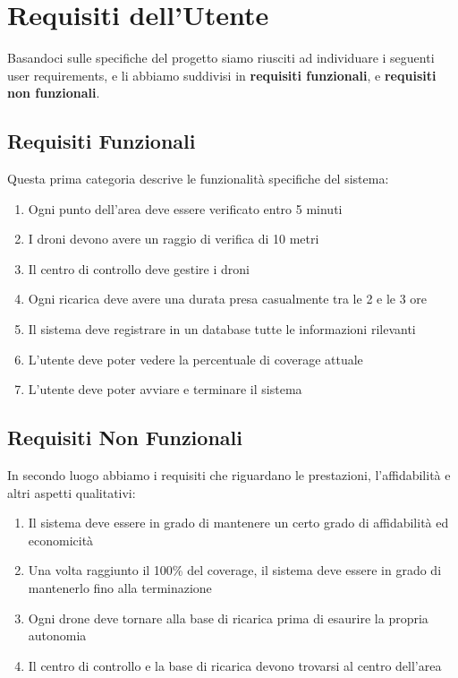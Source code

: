 \documentclass{article}
\begin{document}
\section{Requisiti dell'Utente}
\raggedright\par{\large{
		Basandoci sulle specifiche del progetto siamo riusciti ad individuare i seguenti user requirements, e li abbiamo suddivisi in \textbf{requisiti funzionali}, e \textbf{requisiti non funzionali}.
	}}  \subsection{Requisiti Funzionali}
\raggedright\par{\large{
		Questa prima categoria descrive le funzionalità specifiche del sistema:
	}}
\raggedright\par{\normalsize{
		\begin{enumerate}
			\item Ogni punto dell'area deve essere verificato entro 5 minuti
			\item I droni devono avere un raggio di verifica di 10 metri
			\item Il centro di controllo deve gestire i droni
			\item Ogni ricarica deve avere una durata presa casualmente tra le 2 e le 3 ore
			\item Il sistema deve registrare in un database tutte le informazioni rilevanti
			\item L'utente deve poter vedere la percentuale di coverage attuale
			\item L'utente deve poter avviare e terminare il sistema
		\end{enumerate}
	}}
\subsection{Requisiti Non Funzionali}
\raggedright\par{\large{
		In secondo luogo abbiamo i requisiti che riguardano le prestazioni, l'affidabilità e altri aspetti qualitativi:
	}}
\raggedright\par{\normalsize{
		\begin{enumerate}
			\item Il sistema deve essere in grado di mantenere un certo grado di affidabilità ed economicità
			\item Una volta raggiunto il 100\% del coverage, il sistema deve essere in grado di mantenerlo fino alla terminazione
			\item Ogni drone deve tornare alla base di ricarica prima di esaurire la propria autonomia
			\item Il centro di controllo e la base di ricarica devono trovarsi al centro dell'area
		\end{enumerate}
	}}
\end{document}
